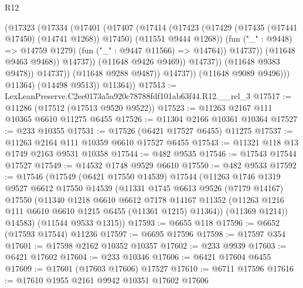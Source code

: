 \begin{lexlean}{R12}
\begin{coremodule}
                                    (@17323
                                      (@17334
                                        (@17401
                                          (@17407
                                            (@17414
                                              (@17423
                                                (@17429
                                                  (@17435 (@17441 @17450) (@14741 @1268))
                                                  @17450)
                                                (@11551 @9444 @1268))
                                              (fun ("_" : @9448) => @14759 @1279)
                                              (fun ("_" : @9447 @11566) => @14764))
                                            @14737))
                                        (@11648 @9463 @9468))
                                      @14737))
                                  (@11648 @9426 @9469))
                                @14737))
                            (@11648 @9383 @9478))
                          @14737))
                      (@11648 @9288 @9487))
                    @14737))
                (@11648 @9089 @9496)))
            @11364)
          (@14498 @9513))
        @11364))
@17513 := LexLeanPreserve.C2ee0173a5a920c78788fdf101ab63f44.R12.__rel_3
@17517 := @11286 (@17512 (@17513 @9520 @9522))
@17523 := @11263 @2167 @111 @10365 @6610 @11275 @6455
@17526 := @11304 @2166 @10361 @10364
@17527 := @233 @10355
@17531 := @17526 (@6421 @17527 @6455) @11275
@17537 := @11263 @2164 @111 @10359 @6610 @17527 @6455
@17543 := @11321 @118 @13 @1749 @2163 @9531 @10358
@17544 := @482 @9535
@17546 := @17543 @17544 @17527
@17549 := @14532 @1748 @9529 @6610
@17550 := @482 @9533
@17592 := @17546
    (@17549
      (@6421 @17550 @14539)
      @17544
      (@11263
        @1746
        @1319
        @9527
        @6612
        @17550
        @14539
        (@11331
          @1745
          @6613
          @9526
          (@7179 @14167)
          @17550
          (@11340
            @1218
            @6610
            @6612
            @7178
            @14167
            @11352
            (@11263 @1216 @111 @6610 @6610 @1215 @6455 (@11361 @1215) @11364))
          (@11369 @1214))
        @14583)
      (@11544 @9533 @1315))
@17593 := @6655 @118
@17596 := @6652 (@17593 @17544) @11236
@17597 := @6695 @17596
@17598 := @17597 @354
@17601 := @17598 @2162 @10352 @10357
@17602 := @233 @9939
@17603 := @6421 @17602
@17604 := @233 @10346
@17606 := @6421 @17604 @6455
@17609 := @17601 (@17603 @17606) @17527
@17610 := @6711 @17596
@17616 := @17610 @1955 @2161 @9942 @10351 @17602 @17606

\end{coremodule}
\end{lexlean}
